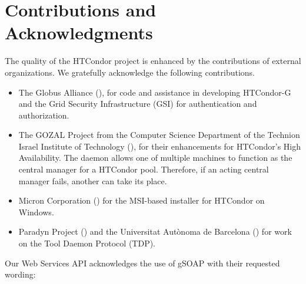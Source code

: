 \section{Contributions and Acknowledgments}\label{sec:contributions}

The quality of the HTCondor project is enhanced by the contributions
of external organizations.
We gratefully acknowledge the following contributions. 

\begin{itemize}

\item{The Globus Alliance} (), 
for code and assistance in developing HTCondor-G
and the Grid Security Infrastructure (GSI)
for authentication and authorization. 

\item{The GOZAL Project}
from the Computer Science Department
of the Technion Israel Institute of Technology
(),
for their enhancements for HTCondor's High Availability.
The  daemon allows one of multiple machines to function
as the central manager for a HTCondor pool.
Therefore, if an acting central manager fails,
another can take its place.


\item{Micron Corporation} ()
for the MSI-based installer for HTCondor on Windows.

\item{Paradyn Project} ()
and the Universitat Aut\`{o}noma de Barcelona
() for work on the Tool Daemon Protocol (TDP).

\end{itemize}

Our Web Services API acknowledges the use of gSOAP with their
requested wording:

